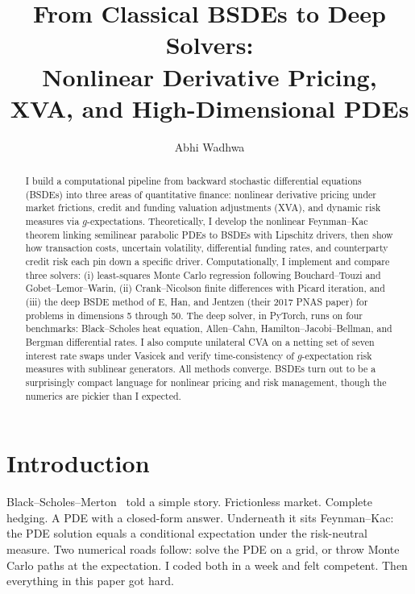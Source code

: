 \documentclass[11pt]{article}
\title{From Classical BSDEs to Deep Solvers:\\
Nonlinear Derivative Pricing, XVA, and High-Dimensional PDEs}
\author{Abhi Wadhwa}
\date{}
\theoremstyle{definition}
\theoremstyle{remark}
\begin{document}
\maketitle

\begin{abstract}
I build a computational pipeline from backward stochastic differential
equations (BSDEs) into three areas of quantitative finance: nonlinear
derivative pricing under market frictions, credit and funding valuation
adjustments (XVA), and dynamic risk measures via $g$-expectations.
Theoretically, I develop the nonlinear Feynman--Kac theorem linking
semilinear parabolic PDEs to BSDEs with Lipschitz drivers, then show how
transaction costs, uncertain volatility, differential funding rates, and
counterparty credit risk each pin down a specific driver.
Computationally, I implement and compare three solvers: (i) least-squares
Monte Carlo regression following Bouchard--Touzi and Gobet--Lemor--Warin,
(ii) Crank--Nicolson finite differences with Picard iteration, and (iii)
the deep BSDE method of E, Han, and Jentzen (their 2017 PNAS paper) for
problems in dimensions 5 through 50.
The deep solver, in PyTorch, runs on four benchmarks:
Black--Scholes heat equation, Allen--Cahn, Hamilton--Jacobi--Bellman, and
Bergman differential rates.
I also compute unilateral CVA on a netting set of seven interest rate
swaps under Vasicek and verify time-consistency of $g$-expectation risk
measures with sublinear generators.
All methods converge.
BSDEs turn out to be a surprisingly compact language for nonlinear
pricing and risk management, though the numerics are pickier than I
expected.
\end{abstract}

\section{Introduction}\label{sec:intro}

Black--Scholes--Merton~\cite{blackscholes1973pricing} told a simple
story. Frictionless market. Complete hedging. A PDE with a closed-form
answer. Underneath it sits Feynman--Kac: the PDE solution equals a
conditional expectation under the risk-neutral measure. Two numerical
roads follow: solve the PDE on a grid, or throw Monte Carlo paths at
the expectation. I coded both in a week and felt competent. Then
everything in this paper got hard.
\end{document}
